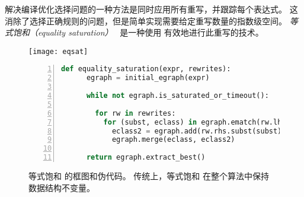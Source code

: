 解决编译优化选择问题的一种方法是同时应用所有重写，并跟踪每个表达式。
这消除了选择正确规则的问题，但是简单实现需要给定重写数量的指数级空间。
\textit{等式饱和（equality saturation）}~\cite{eqsat, eqsat-llvm} 是一种使用 \egraph 有效地进行此重写的技术。




\begin{figure}
  \begin{minipage}{0.48\linewidth}
    \centering
    \texttt{[image: eqsat]}
  \end{minipage}
  \hfill
  \begin{minipage}{0.46\linewidth}
  \begin{lstlisting}[language=Python, gobble=4, numbers=left, basicstyle=\scriptsize\ttfamily]
    def equality_saturation(expr, rewrites):
      egraph = initial_egraph(expr)

      while not egraph.is_saturated_or_timeout():

        for rw in rewrites:
          for (subst, eclass) in egraph.ematch(rw.lhs):
            eclass2 = egraph.add(rw.rhs.subst(subst))
            egraph.merge(eclass, eclass2)

      return egraph.extract_best()
  \end{lstlisting}
  \end{minipage}
  \caption{
    等式饱和 的框图和伪代码。
    传统上，等式饱和 在整个算法中保持 \egraph 数据结构不变量。
  }
  \label{fig:eq-sat-bg}
\end{figure}


